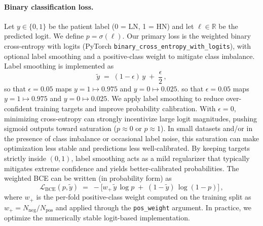 \paragraph{Binary classification loss.}
Let $y\in\{0,1\}$ be the patient label (0 = LN, 1 = HN) and let $\ell\in\mathbb{R}$ be the predicted logit. We define $p=\sigma(\ell)$. Our primary loss is the weighted binary cross-entropy with logits (PyTorch \texttt{binary\_cross\_entropy\_with\_logits}), with optional label smoothing and a positive-class weight to mitigate class imbalance. Label smoothing is implemented as
\begin{equation}\label{eq:label_smooth}
\tilde{y} \;=\; (1-\epsilon)\,y \;+\; \frac{\epsilon}{2}\,,
\end{equation}
so that $\epsilon=0.05$ maps $y=1 \mapsto 0.975$ and $y=0 \mapsto 0.025$. so that $\epsilon=0.05$ maps $y=1 \mapsto 0.975$ and $y=0 \mapsto 0.025$. We apply label smoothing to reduce over-confident training targets and improve probability calibration. With $\epsilon=0$, minimizing cross-entropy can strongly incentivize large logit magnitudes, pushing sigmoid outputs toward saturation ($p\approx 0$ or $p\approx 1$). In small datasets and/or in the presence of class imbalance or occasional label noise, this saturation can make optimization less stable and predictions less well-calibrated. By keeping targets strictly inside $(0,1)$, label smoothing acts as a mild regularizer that typically mitigates extreme confidence and yields better-calibrated probabilities.
The weighted BCE can be written (in probability form) as
\begin{equation}\label{eq:BCE}
\mathcal{L}_{\text{BCE}}(p,\tilde{y}) \;=\;
-\Big[w_{+}\,\tilde{y}\,\log p \;+\; (1-\tilde{y})\,\log(1-p)\Big]\,,
\end{equation}
where $w_{+}$ is the per-fold positive-class weight computed on the training split as $w_{+}=N_{\text{neg}}/N_{\text{pos}}$ and applied through the \texttt{pos\_weight} argument. In practice, we optimize the numerically stable logit-based implementation.

